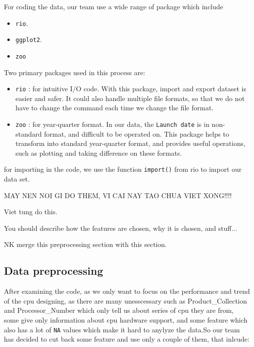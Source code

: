 For coding the data, our team use a wide range of package which include 
\begin{itemize}
    \item \verb|rio|.
    \item \verb|ggplot2|.
    \item \verb|zoo|
\end{itemize}

Two primary packages used in this process are:

\begin{itemize}
    \item \verb|rio| : for intuitive I/O code.
    With this package, import and export dataset is easier and safer. It could 
    also handle multiple file formats, so that we do not have to
    change the command each time we change the file format.

    \item \verb|zoo| : for year-quarter format.
    In our data, the \verb|Launch date| is in non-standard format, and difficult to be operated on. This package helps to transform
    into standard year-quarter format, and provides useful operations, such as plotting and taking difference on these formats.

\end{itemize}


for importing in the code, we use the function \texttt{import()} from rio to import our data set.


MAY NEN NOI GI DO THEM, VI CAI NAY TAO CHUA VIET XONG!!!!

Viet tung do this.

You should describe how the features are chosen, why it is chosen, and stuff...

NK merge this preprocessing section with this section.
\subsection{Data preprocessing}

After examining the code, as we only want to focus on the performance and trend of the cpu designing, as there are many unesscessary such as Product\_Collection and Processor\_Number which only tell us about series of cpu they are from, some give only information about cpu hardware support, and some feature which also has a lot of \texttt{NA} values which make it hard to anylyze the data.So our team has decided to cut back some feature and use only a couple of them, that inlcude:

